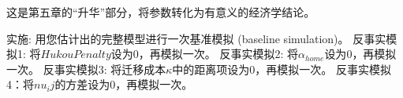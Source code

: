 \documentclass[
  a4paper,
  zihao=-4,
  fontset=mac,
  AutoFakeBold,
  AutoFakeSlant,
  oneside]{ctexbook}
\begin{document}
这是第五章的“升华”部分，将参数转化为有意义的经济学结论。





实施:
用您估计出的完整模型进行一次基准模拟 (baseline simulation)。
反事实模拟1: 将$HukouPenalty$设为$0$，再模拟一次。
反事实模拟2: 将$\alpha_{home}$设为$0$，再模拟一次。
反事实模拟3: 将迁移成本$\kappa$中的距离项设为$0$，再模拟一次。
反事实模拟4：将$nu_ij$的方差设为0，再模拟一次。






\end{document}
